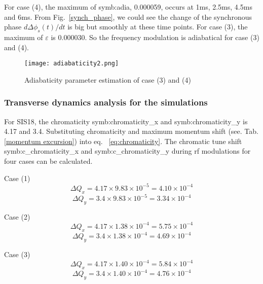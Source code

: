 \begin{itemize}
For case (4), the maximum of \gls{symb:adia}, 0.000059, occurs at 1ms, 2.5ms, 4.5ms and 6ms. From Fig.~\ref{synch_phase}, we could see the change of the synchronous phase $d\Delta \phi_s(t)/dt$  is big but smoothly at these time points. For case (3), the maximum of $\varepsilon$ is 0.000030. So the frequency modulation is adiabatical for case (3) and (4).


\begin{figure}[H]
   \centering   
   \texttt{[image: adiabaticity2.png]}
   \caption{Adiabaticity parameter estimation of case (3) and (4)}
   \label{adiabaticity2}
\end{figure}
\end{itemize}
\subsubsection{Transverse dynamics analysis for the simulations}
For SIS18, the chromaticity \gls{symb:chromaticity_x} and \gls{symb:chromaticity_y} is 4.17 and 3.4. Substituting chromaticity and maximum momentum shift (see. Tab. \ref{momentum excursion}) into eq. ~\ref{eq:chromaticity}. The chromatic tune shift \gls{symb:c_chromaticity_x} and \gls{symb:c_chromaticity_y} during rf modulations for four cases can be calculated. 

Case (1) 
\begin{equation}
\Delta Q_x = 4.17 \times 9.83 \times 10^{-5}=4.10 \times 10^{-4}
\end{equation}
\begin{equation}
\Delta Q_y = 3.4 \times 9.83 \times 10^{-5}=3.34 \times 10^{-4} 
\end{equation}

Case (2)
\begin{equation}
\Delta Q_x = 4.17 \times 1.38 \times 10^{-4}=5.75 \times 10^{-4}
\end{equation}
\begin{equation}
\Delta Q_y = 3.4 \times 1.38 \times 10^{-4}=4.69 \times 10^{-4} 
\end{equation}

Case (3)
\begin{equation}
\Delta Q_x = 4.17 \times 1.40 \times 10^{-4}=5.84 \times 10^{-4}
\end{equation}
\begin{equation}
\Delta Q_y = 3.4 \times 1.40 \times 10^{-4}=4.76 \times 10^{-4} 
\end{equation}

